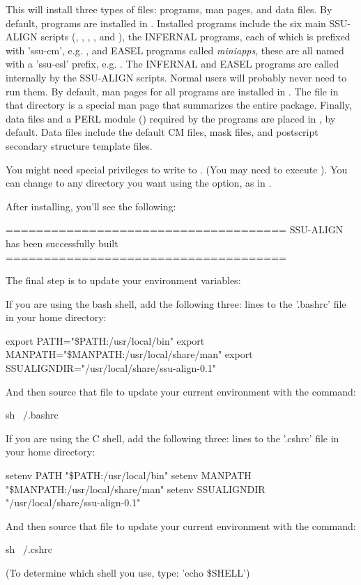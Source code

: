 This will install three types of files: programs, man pages, and data
files.  By default, programs are installed in
. Installed programs include the six main
SSU-ALIGN scripts (, ,
, ,  and
), the INFERNAL programs, each of which is prefixed
with 'ssu-cm', e.g. , and EASEL programs called
\emph{miniapps}, these are all named with a 'ssu-esl' prefix,
e.g. . The INFERNAL and EASEL programs are
called internally by the SSU-ALIGN scripts. Normal users will probably
never need to run them.  By default, man pages for all programs are
installed in . The file  in that
directory is a special man page that summarizes the entire package.
Finally, data files and a PERL module () required by the
programs are placed in , by
default. Data files include the default CM files, mask files, and
postscript secondary structure template files.

You might need special privileges to write to . (You may need to execute
). You can change  to any
directory you want using the  option, as in
.

After installing, you'll see the following:

\begin{sreoutput}
=====================================
SSU-ALIGN has been successfully built
=====================================

The final step is to update your environment variables:

If you are using the bash shell, add the following three:
lines to the '.bashrc' file in your home directory:

export PATH="\$PATH:/usr/local/bin"
export MANPATH="\$MANPATH:/usr/local/share/man"
export SSUALIGNDIR="/usr/local/share/ssu-align-0.1"

And then source that file to update your current
environment with the command:

sh ~/.bashrc

If you are using the C shell, add the following three:
lines to the '.cshrc' file in your home directory:

setenv PATH "\$PATH:/usr/local/bin"
setenv MANPATH "\$MANPATH:/usr/local/share/man"
setenv SSUALIGNDIR "/usr/local/share/ssu-align-0.1"

And then source that file to update your current
environment with the command:

sh ~/.cshrc

(To determine which shell you use, type: 'echo \$SHELL')
\end{sreoutput}

